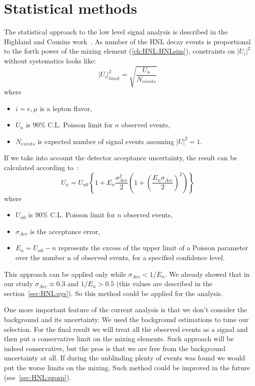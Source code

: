 \documentclass[../main.tex]{subfiles}
\begin{document}
\section{Statistical methods}
\label{sec:HNL:stat}
The statistical approach to the low level signal analysis is described in the Highland and Cousins work~\cite{Cousins1992}. As number of the HNL decay events is proportional to the forth power of the mixing element (\autoref{ch:HNL:HNLsim}), constraints on $\left|U_i\right|^2$ without systematics looks like:
\begin{equation}
  \left|U_i\right|^2_{limit}=\sqrt{\frac{U_n}{N_{events}}}
  \label{eq:HNL:constraints}
\end{equation}
where
\begin{itemize}
    \item $i=e,\mu$ is a lepton flavor,
    \item $U_n$ is 90\% C.L. Poisson limit for $n$ observed events,
    \item $N_{events}$ is expected number of signal events assuming $\left|U\right|^2=1$.
\end{itemize}
If we take into account the detector acceptance uncertainty, the result can be calculated according to~\cite{Cousins1992}:
\begin{equation}
  U_n=U_{n0}\left\{1+E_n\frac{\sigma^2_{Acc}}{2}\left(1+\left(\frac{E_n\sigma_{Acc}}{2}\right)^2\right)\right\}
  \label{eq:HNL:constrainsAcc}
\end{equation}
where
\begin{itemize}
    \item $U_{n0}$ is 90\% C.L. Poisson limit for $n$ observed events,
    \item $\sigma_{Acc}$ is the acceptance error,
    \item $E_n=U_{n0}-n$ represents the excess of the upper limit of a Poisson parameter over the number n of observed events, for a specified confidence level.
\end{itemize}
This approach can be applied only while $\sigma_{Acc}<1/E_n$. We already showed that in our study $\sigma_{Acc}\approx0.3$ and $1/E_n>0.5$ (this values are described in the section~\ref{sec:HNL:sys}). So this method could be applied for the analysis.

One more important feature of the current analysis is that we don't consider the background and its uncertainty. We used the background estimations to tune our selection. For the final result we will treat all the observed events as a signal and then put a conservative limit on the mixing elements. Such approach will be indeed conservative, but the pros is that we are free from the background uncertainty at all. If during the unblinding plenty of events was found we would put the worse limits on the mixing. Such method could be improved in the future (see~\autoref{sec:HNL:prosp}).
\end{document}
